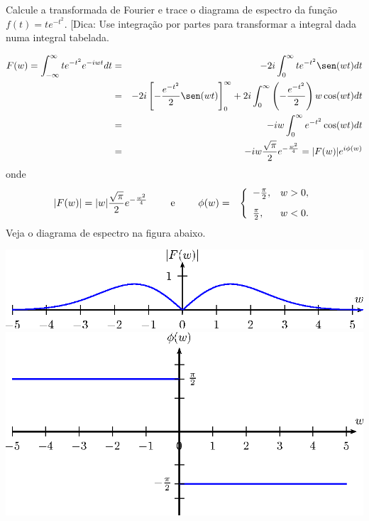 \begin{exer}{\label{exer_te_t2}} Calcule a transformada de Fourier e trace o diagrama de espectro da função $f(t)=te^{-t^2}$. [Dica: Use integração por partes para transformar a integral dada numa integral tabelada.
\end{exer}
\begin{resp}
\begin{eqnarray*}
F(w)=\int_{-\infty}^\infty te^{-t^2}e^{-iwt}dt&=&-2i\int_{0}^\infty te^{-t^2}\sen(wt)dt\\
&=&-2i\left[-\frac{e^{-t^2}}{2}\sen(wt) \right]_0^\infty+2i\int_{0}^\infty \left(-\frac{e^{-t^2}}{2}\right)w\cos(wt)dt\\
&=&-iw\int_{0}^\infty e^{-t^2}\cos(wt)dt\\
&=&-iw\frac{\sqrt{\pi}}{2}e^{-\frac{w^2}{4}}=|F(w)|e^{i\phi(w)}
\end{eqnarray*}
onde
\begin{eqnarray*}
|F(w)|=|w|\frac{\sqrt{\pi}}{2}e^{-\frac{w^2}{4}}\qquad\hbox{ e }\qquad \phi(w)&=&\left\{\begin{array}{ll}
-\frac{\pi}{2},&w>0,\\[.3cm]
\frac{\pi}{2},&w<0.
\end{array}\right.
\end{eqnarray*}
Veja o diagrama de espectro na figura abaixo.
\begin{center}
\includegraphics{cap_diagramas_espectro_transformada/pics/figura_4}
\includegraphics{cap_diagramas_espectro_transformada/pics/figura_5}\end{center}
\end{resp}

